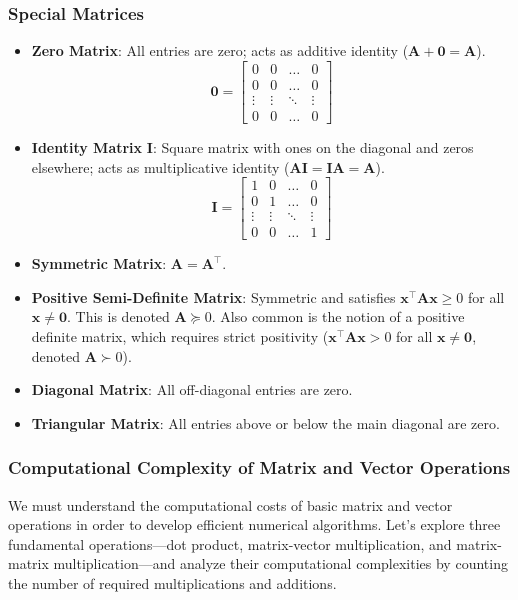 \subsubsection{Special Matrices}
\begin{itemize}
    \item \textbf{Zero Matrix}: All entries are zero; acts as additive identity ($ \mathbf{A} + \mathbf{0} = \mathbf{A} $).
    \begin{equation*}
        \mathbf{0} = \begin{bmatrix}0 & 0 & \ldots & 0\\0 & 0 & \ldots & 0\\ \vdots & \vdots & \ddots & \vdots\\0 & 0 & \ldots & 0\end{bmatrix}
    \end{equation*}
    \item \textbf{Identity Matrix} $ \mathbf{I} $: Square matrix with ones on the diagonal and zeros elsewhere; acts as multiplicative identity ($ \mathbf{A}\mathbf{I} = \mathbf{I}\mathbf{A} = \mathbf{A} $).
    \begin{equation*}
        \mathbf{I} = \begin{bmatrix}1 & 0 & \ldots & 0\\0 & 1 & \ldots & 0\\ \vdots & \vdots & \ddots & \vdots\\0 & 0 & \ldots & 1\end{bmatrix}
    \end{equation*}
    \item \textbf{Symmetric Matrix}: $ \mathbf{A} = \mathbf{A}^\top $.
    \item \textbf{Positive Semi-Definite Matrix}: Symmetric and satisfies $ \mathbf{x}^\top \mathbf{A} \mathbf{x} \geq 0 $ for all $ \mathbf{x} \neq \mathbf{0} $. This is denoted $ \mathbf{A} \succeq 0 $. Also common is the notion of a positive definite matrix, which requires strict positivity ($ \mathbf{x}^\top \mathbf{A} \mathbf{x} > 0 $ for all $ \mathbf{x} \neq \mathbf{0} $, denoted $ \mathbf{A} \succ 0 $).
    \item \textbf{Diagonal Matrix}: All off-diagonal entries are zero.
    \item \textbf{Triangular Matrix}: All entries above or below the main diagonal are zero.
\end{itemize}


\subsubsection{Computational Complexity of Matrix and Vector Operations}
\label{sec:complexity-of-matrix-and-vector-operations}
We must understand the computational costs of basic matrix and vector operations in order to develop efficient numerical algorithms. Let's explore three fundamental operations---dot product, matrix-vector multiplication, and matrix-matrix multiplication---and analyze their computational complexities by counting the number of required multiplications and additions.


